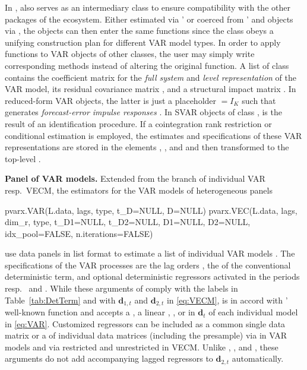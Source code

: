 In ,  also serves as an intermediary class to ensure compatibility with the other packages of the  ecosystem. Either estimated via '  or coerced from '  and  objects via , the  objects can then enter the same functions since the class obeys a unifying construction plan for different VAR model types. In order to apply  functions to VAR objects of other classes, the user may simply write corresponding  methods instead of altering the original  function. 
A list of class  contains the coefficient matrix  for the \textit{full system} and \textit{level representation} of the VAR model, its residual covariance matrix , and a structural impact matrix . In reduced-form VAR objects, the latter is just a placeholder  $ = I_K $ such that  generates \textit{forecast-error impulse responses} \citep[p.~52]{Lutkepohl2005}. In SVAR objects of class ,  is the result of an identification procedure. If a cointegration rank restriction or conditional estimation is employed, the estimates and specifications of these VAR representations are stored in the elements , , and  and then transformed to the top-level .


\textbf{Panel of VAR models.} Extended from the branch of individual VAR resp.~VECM, the estimators for the VAR models of heterogeneous panels
\begin{CodeChunk}
\begin{CodeInput}
pvarx.VAR(L.data, lags, type, t_D=NULL, D=NULL)
pvarx.VEC(L.data, lags, dim_r, type, t_D1=NULL, t_D2=NULL, 
          D1=NULL, D2=NULL, idx_pool=FALSE, n.iterations=FALSE)
\end{CodeInput}
\end{CodeChunk}
use data panels in list format  to estimate a list of individual VAR models . The specifications of the VAR processes are the lag orders , the  of the conventional deterministic term, and optional deterministic regressors activated in the periods  resp.~ and . While these arguments of  comply with the labels in Table~\ref{tab:DetTerm} and with $ \boldsymbol{d}_{1,t} $ and $ \boldsymbol{d}_{2,t} $ in \eqref{eq:VECM},  is in accord with ' well-known  function and accepts a , a linear , , or  in $ \boldsymbol{d}_{t} $ of each individual model in \eqref{eq:VAR}. Customized regressors can be included as a common single data matrix or a  of individual data matrices (including the presample) via  in VAR models and via restricted  and unrestricted  in VECM. Unlike , , and , these arguments do not add accompanying lagged regressors to $ \boldsymbol{d}_{2,t} $ automatically.
 
